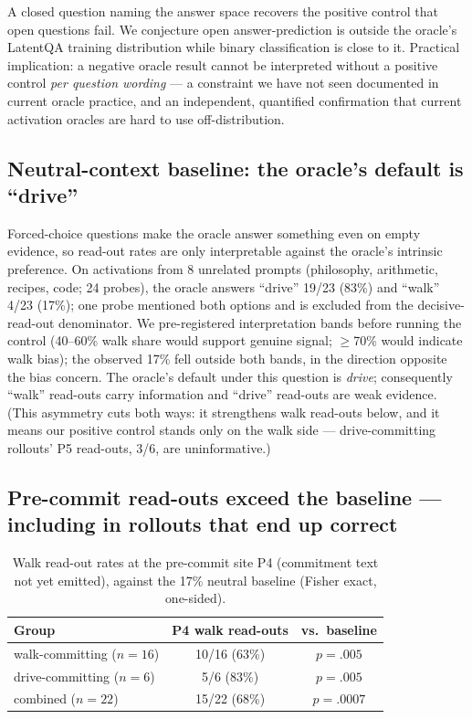 \documentclass[11pt]{article}
\begin{document}
A closed question naming the answer space recovers the positive control
that open questions fail. We conjecture open answer-prediction is outside
the oracle's LatentQA training distribution while binary classification is
close to it. Practical implication: a negative oracle result cannot be
interpreted without a positive control \emph{per question wording} --- a
constraint we have not seen documented in current oracle practice, and an
independent, quantified confirmation that current activation oracles are
hard to use off-distribution.

\subsection{Neutral-context baseline: the oracle's default is ``drive''}
\label{sec:neutral}

Forced-choice questions make the oracle answer something even on empty
evidence, so read-out rates are only interpretable against the oracle's
intrinsic preference. On activations from 8 unrelated prompts (philosophy,
arithmetic, recipes, code; 24 probes), the oracle answers ``drive'' 19/23
(83\%) and ``walk'' 4/23 (17\%); one probe mentioned both options and is
excluded from the decisive-read-out denominator. We pre-registered
interpretation bands before running the control (40--60\% walk share would
support genuine signal; $\geq$70\% would indicate walk bias); the observed
17\% fell outside both bands, in the direction opposite the bias concern. The oracle's default under this question is
\emph{drive}; consequently ``walk'' read-outs carry information and
``drive'' read-outs are weak evidence. (This asymmetry cuts both ways: it
strengthens walk read-outs below, and it means our positive control stands
only on the walk side --- drive-committing rollouts' P5 read-outs, 3/6,
are uninformative.)

\subsection{Pre-commit read-outs exceed the baseline --- including in
rollouts that end up correct}
\label{sec:precommit}

\begin{table}[ht]
\centering
\begin{tabular}{lcc}
\toprule
Group & P4 walk read-outs & vs.\ baseline \\
\midrule
walk-committing ($n=16$) & 10/16 (63\%) & $p = .005$ \\
drive-committing ($n=6$) & 5/6 (83\%) & $p = .005$ \\
combined ($n=22$) & 15/22 (68\%) & $p = .0007$ \\
\bottomrule
\end{tabular}
\caption{Walk read-out rates at the pre-commit site P4 (commitment text
not yet emitted), against the 17\% neutral baseline (Fisher exact,
one-sided).}
\label{tab:precommit}
\end{table}
\end{document}
